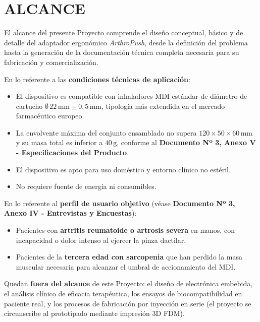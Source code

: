 \documentclass[11pt,a4paper]{article}
\begin{document}
\section{ALCANCE}

El alcance del presente Proyecto comprende el diseño conceptual, básico y de detalle del adaptador ergonómico \textit{ArthroPush}, desde la definición del problema hasta la generación de la documentación técnica completa necesaria para su fabricación y comercialización.

En lo referente a las \textbf{condiciones técnicas de aplicación}:

\begin{itemize}
    \item El dispositivo es compatible con inhaladores MDI estándar de diámetro de cartucho $\emptyset\,22\,\text{mm} \pm 0{,}5\,\text{mm}$, tipología más extendida en el mercado farmacéutico europeo.
    \item La envolvente máxima del conjunto ensamblado no supera $120 \times 50 \times 60\,\text{mm}$ y su masa total es inferior a $40\,\text{g}$, conforme al \textbf{Documento Nº 3, Anexo V - Especificaciones del Producto}.
    \item El dispositivo es apto para uso doméstico y entorno clínico no estéril.
    \item No requiere fuente de energía ni consumibles.
\end{itemize}

En lo referente al \textbf{perfil de usuario objetivo} (véase \textbf{Documento Nº 3, Anexo IV - Entrevistas y Encuestas}):

\begin{itemize}
    \item Pacientes con \textbf{artritis reumatoide o artrosis severa} en manos, con incapacidad o dolor intenso al ejercer la pinza dactilar.
    \item Pacientes de la \textbf{tercera edad con sarcopenia} que han perdido la masa muscular necesaria para alcanzar el umbral de accionamiento del MDI.
\end{itemize}

Quedan \textbf{fuera del alcance} de este Proyecto: el diseño de electrónica embebida, el análisis clínico de eficacia terapéutica, los ensayos de biocompatibilidad en paciente real, y los procesos de fabricación por inyección en serie (el proyecto se circunscribe al prototipado mediante impresión 3D FDM).
\end{document}
